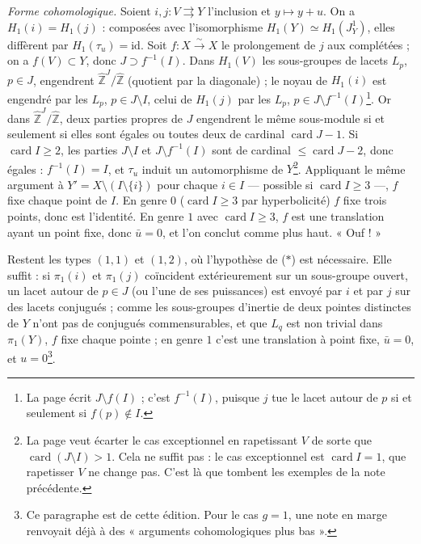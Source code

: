 \documentclass[11pt,a4paper]{article}
\begin{document}
\emph{Forme cohomologique.} Soient $i, j : V \rightrightarrows Y$ l'inclusion
et $y \mapsto y + u$. On a $H_1(i) = H_1(j)$ : composées avec l'isomorphisme
$H_1(Y) \simeq H_1(J^1_Y)$, elles diffèrent par $H_1(\tau_u) = \mathrm{id}$.
Soit $f : X \xrightarrow{\sim} X$ le prolongement de $j$ aux complétées ; on a
$f(V) \subset Y$, donc $J \supset f^{-1}(I)$. Dans $H_1(V) $ les sous-groupes de
lacets $L_p$, $p \in J$, engendrent $\widehat{\mathbb{Z}}^J/\widehat{\mathbb{Z}}$
(quotient par la diagonale) ; le noyau de $H_1(i)$ est engendré par les $L_p$,
$p \in J \setminus I$, celui de $H_1(j)$ par les $L_p$, $p \in J \setminus
f^{-1}(I)$\footnote{La page écrit $J \setminus f(I)$ ; c'est $f^{-1}(I)$,
puisque $j$ tue le lacet autour de $p$ si et seulement si $f(p) \notin I$.}.
Or dans $\widehat{\mathbb{Z}}^J/\widehat{\mathbb{Z}}$, deux parties propres de
$J$ engendrent le même sous-module si et seulement si elles sont égales ou
toutes deux de cardinal $\operatorname{card} J - 1$. Si $\operatorname{card} I
\ge 2$, les parties $J \setminus I$ et $J \setminus f^{-1}(I)$ sont de cardinal
$\le \operatorname{card} J - 2$, donc égales : $f^{-1}(I) = I$, et $\tau_u$
induit un automorphisme de $Y$\footnote{La page veut écarter le cas
exceptionnel en rapetissant $V$ de sorte que $\operatorname{card}(J \setminus
I) > 1$. Cela ne suffit pas : le cas exceptionnel est $\operatorname{card} I
= 1$, que rapetisser $V$ ne change pas. C'est là que tombent les exemples de
la note précédente.}. Appliquant le même argument à $Y' = X \setminus (I
\setminus \{i\})$ pour chaque $i \in I$ — possible si $\operatorname{card} I
\ge 3$ —, $f$ fixe chaque point de $I$. En genre $0$ ($\operatorname{card} I
\ge 3$ par hyperbolicité) $f$ fixe trois points, donc est l'identité. En genre
$1$ avec $\operatorname{card} I \ge 3$, $f$ est une translation ayant un point
fixe, donc $\bar u = 0$, et l'on conclut comme plus haut. « Ouf ! »

Restent les types $(1,1)$ et $(1,2)$, où l'hypothèse de ($\ast$) est
nécessaire. Elle suffit : si $\pi_1(i)$ et $\pi_1(j)$ coïncident
extérieurement sur un sous-groupe ouvert, un lacet autour de $p \in J$ (ou
l'une de ses puissances) est envoyé par $i$ et par $j$ sur des lacets
conjugués ; comme les sous-groupes d'inertie de deux pointes distinctes de
$Y$ n'ont pas de conjugués commensurables, et que $L_q$ est non trivial dans
$\pi_1(Y)$, $f$ fixe chaque pointe ; en genre $1$ c'est une translation à
point fixe, $\bar u = 0$, et $u = 0$\footnote{Ce paragraphe est de cette
édition. Pour le cas $g = 1$, une note en marge renvoyait déjà à des
« arguments cohomologiques plus bas ».}.
\end{document}
